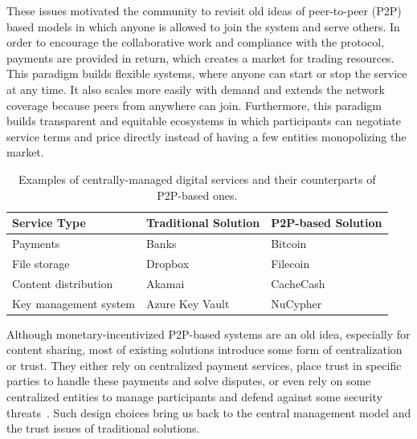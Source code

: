 \documentclass{llncs}
\begin{document}
These issues motivated the community to revisit old ideas of peer-to-peer (P2P) based models in which anyone is allowed to join the system and serve others. In order to encourage the collaborative work and compliance with the protocol, payments are provided in return, which creates a market for trading resources. This paradigm builds flexible systems, where anyone can start or stop the service at any time. It also scales more easily with demand and extends the network coverage because peers from anywhere can join. Furthermore, this paradigm builds transparent and equitable ecosystems in which participants can negotiate service terms and price directly instead of having a few entities monopolizing the market. 


\begin{table}[t!]
\caption{Examples of centrally-managed digital services and their counterparts of P2P-based ones.} 
\label{service-examples}
\centering 
\begin{tabular}{| p{}  | p{} | p{} |}\hline\hline

{\bf Service Type} & {\bf Traditional Solution} & {\bf P2P-based Solution}  \\[0.5ex] \hline \hline
 
Payments & Banks & Bitcoin  \\[0.5ex] \hline

File storage & Dropbox~\cite{dropbox} &  Filecoin~\cite{filecoin}  \\ [0.5ex]  \hline   

Content distribution & Akamai~\cite{akamai} & CacheCash~\cite{almashaqbeh2019cachecash}  \\ [0.5ex]  \hline
    
Key management system & Azure Key Vault~\cite{azure} & NuCypher~\cite{nucypher}  \\ [0.5ex]  \hline    

\end{tabular}
\end{table} 



Although monetary-incentivized P2P-based systems are an old idea, especially for content sharing, most of existing solutions introduce some form of centralization or trust. They either rely on centralized payment services, place trust in specific parties to handle these payments and solve disputes, or even rely on some centralized entities to manage participants and defend against some security threats~\cite{Kassa13,Nair08,Zhang09}. Such design choices bring us back to the central management model and the trust issues of traditional solutions.
\end{document}
